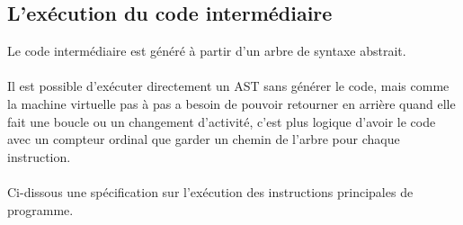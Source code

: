 \documentclass[12pt]{scrartcl}
\begin{document}
\newpage

\subsection{L'exécution du code intermédiaire}
\noindent Le code intermédiaire est généré à partir d'un arbre de syntaxe abstrait. \\\\
Il est possible d'exécuter directement un AST sans générer le code, mais 
comme la machine virtuelle pas à pas a besoin de pouvoir retourner en arrière quand elle 
fait une boucle ou un changement d'activité, c'est plus logique d'avoir le code avec un compteur ordinal
que garder un chemin de l'arbre pour chaque instruction. \\\\
Ci-dissous une spécification sur l'exécution des instructions principales de programme.\\
\end{document}
